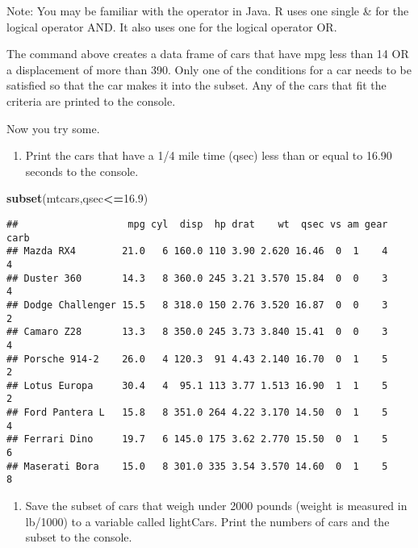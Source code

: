 \documentclass[]{article}
\newenvironment{Shaded}{\begin{snugshade}}{\end{snugshade}}
\newcommand{\KeywordTok}[1]{\textcolor[rgb]{0.13,0.29,0.53}{\textbf{#1}}}
\newcommand{\FloatTok}[1]{\textcolor[rgb]{0.00,0.00,0.81}{#1}}
\newcommand{\OperatorTok}[1]{\textcolor[rgb]{0.81,0.36,0.00}{\textbf{#1}}}
\newcommand{\NormalTok}[1]{#1}
\providecommand{\tightlist}{%
  \setlength{\itemsep}{0pt}\setlength{\parskip}{0pt}}
\begin{document}
Note: You may be familiar with the \textbar{}\textbar{} operator in
Java. R uses one single \& for the logical operator AND. It also uses
one \textbar{} for the logical operator OR.

The command above creates a data frame of cars that have mpg less than
14 OR a displacement of more than 390. Only one of the conditions for a
car needs to be satisfied so that the car makes it into the subset. Any
of the cars that fit the criteria are printed to the console.

Now you try some.

\begin{enumerate}
\def\labelenumi{\arabic{enumi}.}
\setcounter{enumi}{5}
\tightlist
\item
  Print the cars that have a 1/4 mile time (qsec) less than or equal to
  16.90 seconds to the console.
\end{enumerate}

\begin{Shaded}
\begin{Highlighting}[]
\KeywordTok{subset}\NormalTok{(mtcars,qsec}\OperatorTok{<=}\FloatTok{16.9}\NormalTok{)}
\end{Highlighting}
\end{Shaded}

\begin{verbatim}
##                   mpg cyl  disp  hp drat    wt  qsec vs am gear carb
## Mazda RX4        21.0   6 160.0 110 3.90 2.620 16.46  0  1    4    4
## Duster 360       14.3   8 360.0 245 3.21 3.570 15.84  0  0    3    4
## Dodge Challenger 15.5   8 318.0 150 2.76 3.520 16.87  0  0    3    2
## Camaro Z28       13.3   8 350.0 245 3.73 3.840 15.41  0  0    3    4
## Porsche 914-2    26.0   4 120.3  91 4.43 2.140 16.70  0  1    5    2
## Lotus Europa     30.4   4  95.1 113 3.77 1.513 16.90  1  1    5    2
## Ford Pantera L   15.8   8 351.0 264 4.22 3.170 14.50  0  1    5    4
## Ferrari Dino     19.7   6 145.0 175 3.62 2.770 15.50  0  1    5    6
## Maserati Bora    15.0   8 301.0 335 3.54 3.570 14.60  0  1    5    8
\end{verbatim}

\begin{enumerate}
\def\labelenumi{\arabic{enumi}.}
\setcounter{enumi}{6}
\tightlist
\item
  Save the subset of cars that weigh under 2000 pounds (weight is
  measured in lb/1000) to a variable called lightCars. Print the numbers
  of cars and the subset to the console.
\end{enumerate}
\end{document}
